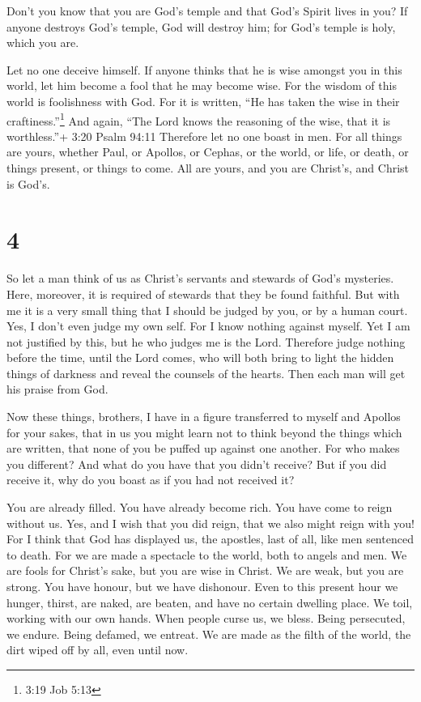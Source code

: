 Don't you know that you are God's temple and that God's
Spirit lives in you?  If anyone destroys God's temple, God
will destroy him; for God's temple is holy, which you are.

 Let no one deceive himself. If anyone thinks that he is
wise amongst you in this world, let him become a fool that he may become
wise.  For the wisdom of this world is foolishness with
God. For it is written, ``He has taken the wise in their
craftiness.''\footnote{3:19 Job 5:13}  And again, ``The
Lord knows the reasoning of the wise, that it is worthless.''+ 3:20
Psalm 94:11  Therefore let no one boast in men. For all
things are yours,  whether Paul, or Apollos, or Cephas, or
the world, or life, or death, or things present, or things to come. All
are yours,  and you are Christ's, and Christ is God's.

\hypertarget{section-3}{%
\section{4}\label{section-3}}

 So let a man think of us as Christ's servants and stewards
of God's mysteries.  Here, moreover, it is required of
stewards that they be found faithful.  But with me it is a
very small thing that I should be judged by you, or by a human court.
Yes, I don't even judge my own self.  For I know nothing
against myself. Yet I am not justified by this, but he who judges me is
the Lord.  Therefore judge nothing before the time, until
the Lord comes, who will both bring to light the hidden things of
darkness and reveal the counsels of the hearts. Then each man will get
his praise from God.

 Now these things, brothers, I have in a figure transferred
to myself and Apollos for your sakes, that in us you might learn not to
think beyond the things which are written, that none of you be puffed up
against one another.  For who makes you different? And what
do you have that you didn't receive? But if you did receive it, why do
you boast as if you had not received it?

 You are already filled. You have already become rich. You
have come to reign without us. Yes, and I wish that you did reign, that
we also might reign with you!  For I think that God has
displayed us, the apostles, last of all, like men sentenced to death.
For we are made a spectacle to the world, both to angels and men.
 We are fools for Christ's sake, but you are wise in
Christ. We are weak, but you are strong. You have honour, but we have
dishonour.  Even to this present hour we hunger, thirst,
are naked, are beaten, and have no certain dwelling place. 
We toil, working with our own hands. When people curse us, we bless.
Being persecuted, we endure.  Being defamed, we entreat. We
are made as the filth of the world, the dirt wiped off by all, even
until now.

